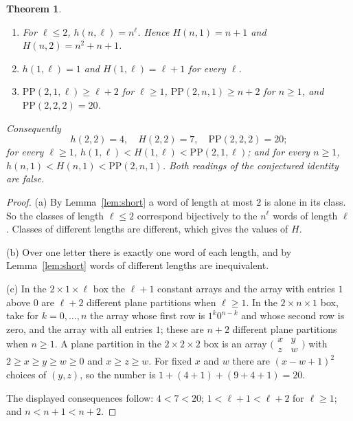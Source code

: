 \documentclass[11pt]{article}
\newtheorem{theorem}{Theorem}
\theoremstyle{remark}
\begin{document}
\begin{theorem}\label{thm:main}
\begin{enumerate}
\item[(a)] For $\ell\le2$, $h(n,\ell)=n^\ell$. Hence $H(n,1)=n+1$ and
$H(n,2)=n^2+n+1$.
\item[(b)] $h(1,\ell)=1$ and $H(1,\ell)=\ell+1$ for every $\ell$.
\item[(c)] $\mathrm{PP}(2,1,\ell)\ge\ell+2$ for $\ell\ge1$,
$\mathrm{PP}(2,n,1)\ge n+2$ for $n\ge1$, and
$\mathrm{PP}(2,2,2)=20$.
\end{enumerate}

\noindent Consequently
\[
 h(2,2)=4,\quad H(2,2)=7,\quad \mathrm{PP}(2,2,2)=20;
\]
for every $\ell\ge1$, $h(1,\ell)<H(1,\ell)<\mathrm{PP}(2,1,\ell)$; and
for every $n\ge1$, $h(n,1)<H(n,1)<\mathrm{PP}(2,n,1)$. Both readings of
the conjectured identity are false.
\end{theorem}
\begin{proof}
(a) By Lemma~\ref{lem:short} a word of length at most $2$ is alone in
its class. So the classes of length $\ell\le2$ correspond bijectively to
the $n^\ell$ words of length $\ell$. Classes of different lengths are
different, which gives the values of $H$.

(b) Over one letter there is exactly one word of each length, and by
Lemma~\ref{lem:short} words of different lengths are inequivalent.

(c) In the $2\times1\times\ell$ box the $\ell+1$ constant arrays and
the array with entries $1$ above $0$ are $\ell+2$ different plane
partitions when $\ell\ge1$. In the $2\times n\times1$ box, take for
$k=0,\dots,n$ the array whose first row is $1^k0^{n-k}$ and whose second
row is zero, and the array with all entries $1$; these are $n+2$
different plane partitions when $n\ge1$. A plane partition in the
$2\times2\times2$ box is an array
$\bigl(\begin{smallmatrix}x&y\\z&w\end{smallmatrix}\bigr)$ with
$2\ge x\ge y\ge w\ge0$ and $x\ge z\ge w$. For fixed $x$ and $w$ there
are $(x-w+1)^2$ choices of $(y,z)$, so the number is
$1+(4+1)+(9+4+1)=20$.

The displayed consequences follow: $4<7<20$; $1<\ell+1<\ell+2$ for
$\ell\ge1$; and $n<n+1<n+2$.
\end{proof}
\end{document}
